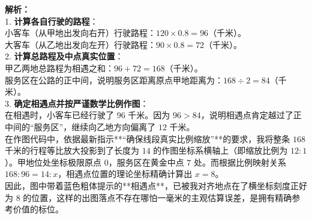 \vspace{0.8cm}

\begin{center}
\end{center}

\vspace{0.6cm}
{\small\color{gray}
\textbf{解析：}\\
1. \textbf{计算各自行驶的路程}：\\
\indent 小客车（从甲地出发向右开）行驶路程：$120 \times 0.8 = 96$（千米）。\\
\indent 大客车（从乙地出发向左开）行驶路程：$90 \times 0.8 = 72$（千米）。\\
2. \textbf{计算总路程及中点真实位置}：\\
\indent 甲乙两地总路程为相遇之和：$96 + 72 = 168$（千米）。\\
\indent 服务区在公路的正中间，说明服务区距离原点甲地距离为：$168 \div 2 = 84$（千米）。\\
3. \textbf{确定相遇点并按严谨数学比例作图}：\\
\indent 在相遇时，小客车已经行驶了 $96$ 千米。因为 $96 > 84$，说明相遇点肯定越过了正中间的“服务区”，继续向乙地方向偏离了 $12$ 千米。\\
\indent 在作图代码中，依据最新指示**“确保线段真实比例缩放”**的要求，我将整条 $168$ 千米的行程等比放大投影到了长度为 $14$ 的作图坐标系横轴上（即缩放比例为 $12:1$）。甲地位处坐标极限原点 $0$，服务区在黄金中点 $7$ 处。而根据比例映射关系 $168 : 96 = 14 : x$，相遇点位置的理论坐标精确计算出 $x = 8$。\\
\indent 因此，图中带着蓝色粗体提示的**相遇点**，已被我对齐地点在了横坐标刻度正好为 $8$ 的位置，这样的出图落点不存在哪怕一毫米的主观估算误差，是拥有精确参考价值的标位。
}


